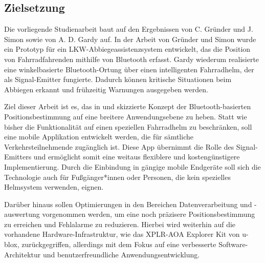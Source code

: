 \documentclass[a4paper, 12pt]{article} %
\begin{document}
\clearpage

\subsection{Zielsetzung}
\begin{spacing}{1.8}  %
    \fontsize{14pt}{15pt}\selectfont

    Die vorliegende Studienarbeit baut auf den Ergebnissen von C.
     Gründer und J. Simon\cite{grunder_simon_2024} sowie von A. D. Gardy\cite{gardy_andy_2023} auf.
      In der Arbeit von Gründer und Simon wurde ein Prototyp für ein LKW-Abbiegeassistenzsystem entwickelt, das die Position von Fahrradfahrenden mithilfe von Bluetooth erfasst. Gardy wiederum realisierte 
      eine winkelbasierte Bluetooth-Ortung über einen intelligenten Fahrradhelm, der als 
      Signal-Emitter fungierte. Dadurch können kritische Situationen beim Abbiegen erkannt und 
      frühzeitig Warnungen ausgegeben werden.

Ziel dieser Arbeit ist es, das in \cite{grunder_simon_2024} und \cite{gardy_andy_2023} skizzierte Konzept der Bluetooth-basierten 
Positionsbestimmung auf eine breitere Anwendungsebene zu heben. Statt wie bisher die 
Funktionalität auf einen speziellen Fahrradhelm zu beschränken, soll eine mobile Applikation 
entwickelt werden, die für sämtliche Verkehrsteilnehmende zugänglich ist. Diese App übernimmt
 die Rolle des Signal-Emitters und ermöglicht somit eine weitaus flexiblere und 
 kostengünstigere Implementierung. Durch die Einbindung in gängige mobile Endgeräte soll sich 
 die Technologie auch für
 Fußgänger*innen oder Personen, die kein spezielles Helmsystem 
 verwenden, eignen.

Darüber hinaus sollen Optimierungen in den Bereichen Datenverarbeitung 
und -auswertung vorgenommen werden, um eine noch präzisere 
Positionsbestimmung zu erreichen und Fehlalarme zu reduzieren. 
Hierbei wird weiterhin auf die vorhandene Hardware-Infrastruktur, 
wie das XPLR-AOA Explorer Kit von u-blox, zurückgegriffen, allerdings 
mit dem Fokus auf eine verbesserte Software-Architektur und benutzerfreundliche 
Anwendungsentwicklung. 


\end{spacing}
\end{document}
